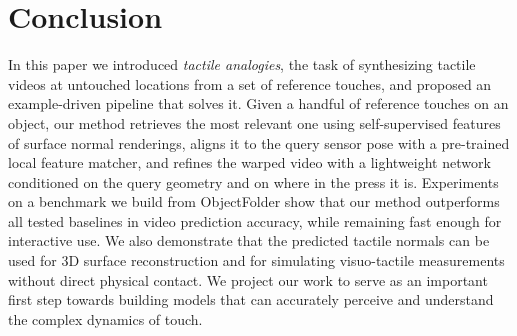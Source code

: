 \section{Conclusion}
\label{sec:conclusion}

In this paper we introduced \emph{tactile analogies}, the task of synthesizing tactile videos at
untouched locations from a set of reference touches, and proposed an example-driven pipeline that
solves it. Given a handful of reference touches on an object, our method retrieves the most
relevant one using self-supervised features of surface normal renderings, aligns it to the query
sensor pose with a pre-trained local feature matcher, and refines the warped video with a
lightweight network conditioned on the query geometry and on where in the press it is. Experiments
on a benchmark we build from ObjectFolder show that our method outperforms all tested baselines in
video prediction accuracy, while remaining fast enough for interactive use. We also demonstrate
that the predicted tactile normals can be used for 3D surface reconstruction and for simulating
visuo-tactile measurements without direct physical contact.
We project our work to serve as an important first step towards building models
that can accurately perceive and understand the complex dynamics of touch.
